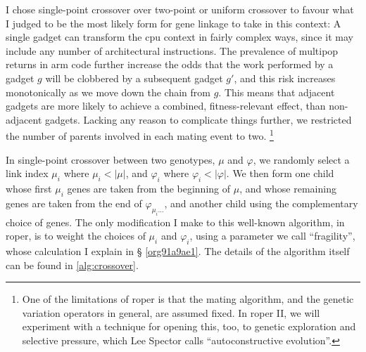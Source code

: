 \documentclass[12pt,glossary]{dalthesis}
\begin{document}
I chose single-point crossover over two-point or uniform crossover to favour
what I judged to be the most likely form for gene linkage to take in this
context: A single gadget can transform the \gls{cpu} context in fairly complex
ways, since it may include any number of architectural instructions. The
prevalence of multipop returns in \gls{arm} code further increase the odds that
the work performed by a gadget \(g\) will be clobbered by a subsequent gadget
\(g'\), and this risk increases monotonically as we move down the chain from \(g\).
This means that adjacent gadgets are more likely to achieve a combined,
fitness-relevant effect, than non-adjacent gadgets. Lacking any reason to
complicate things further, we restricted the number of parents involved in each
mating event to two. \footnote{One of the limitations of \gls{roper} is that the mating
algorithm, and the genetic variation operators in general, are assumed fixed. In
\gls{roper} II, we will experiment with a technique for opening this, too, to
genetic exploration and selective pressure, which Lee Spector calls
``autoconstructive evolution''.}


In single-point crossover between two genotypes, \(\mu\) and \(\varphi\), we
randomly select a link index \(\mu_i\) where \(\mu_i < |\mu|\), and \(\varphi_i\)
where \(\varphi_i < |\varphi|\). We then form one child whose first \(\mu_i\) genes
are taken from the beginning of \(\mu\), and whose remaining genes are taken from
the end of \(\varphi_{\mu_i\dots}\), and another child using the complementary
choice of genes. The only modification I make to this well-known algorithm, in
\gls{roper}, is to weight the choices of \(\mu_i\) and \(\varphi_i\), using a
parameter we call ``fragility'', whose calculation I explain in \S
\ref{org91a9ae1}. The details of the algorithm itself can be found in
\ref{alg:crossover}.
\end{document}
